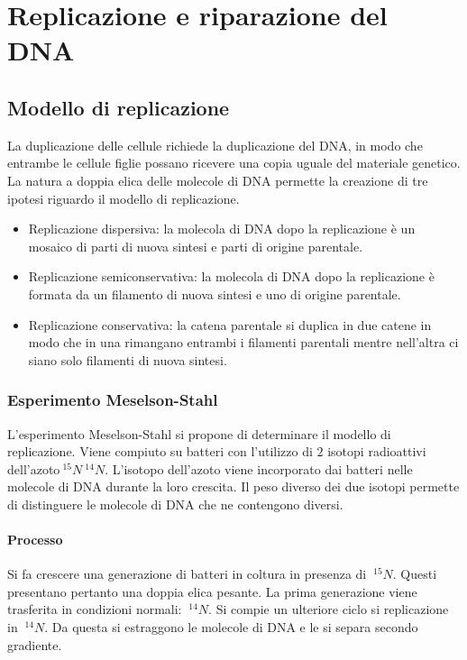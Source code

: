 \chapter{Replicazione e riparazione del DNA}

\section{Modello di replicazione}
La duplicazione delle cellule richiede la duplicazione del DNA, in modo che entrambe le cellule figlie possano ricevere una copia uguale del materiale genetico.
La natura a doppia elica delle molecole di DNA permette la creazione di tre ipotesi riguardo il modello di replicazione.
\begin{multicols}{2}
	\begin{itemize}
		\item Replicazione dispersiva: la molecola di DNA dopo la replicazione \`e un mosaico di parti di nuova sintesi e parti di origine parentale.
		\item Replicazione semiconservativa: la molecola di DNA dopo la replicazione \`e formata da un filamento di nuova sintesi e uno di origine parentale.
		\item Replicazione conservativa: la catena parentale si duplica in due catene in modo che in una rimangano entrambi i filamenti parentali mentre nell'altra ci siano solo filamenti di nuova sintesi.
	\end{itemize}
\end{multicols}

	\subsection{Esperimento Meselson-Stahl}
	L'esperimento Meselson-Stahl si propone di determinare il modello di replicazione.
	Viene compiuto su batteri con l'utilizzo di $2$ isotopi radioattivi dell'azoto\emph{$\ ^{15}N\ ^{14}N$}.
	L'isotopo dell'azoto viene incorporato dai batteri nelle molecole di DNA durante la loro crescita.
	Il peso diverso dei due isotopi permette di distinguere le molecole di DNA che ne contengono diversi.

		\subsubsection{Processo}
		Si fa crescere una generazione di batteri in coltura in presenza di \emph{$\ ^{15}N$}.
		Questi presentano pertanto una doppia elica pesante.
		La prima generazione viene trasferita in condizioni normali: \emph{$\ ^{14}N$}.
		Si compie un ulteriore ciclo si replicazione in \emph{$\ ^{14}N$}.
		Da questa si estraggono le molecole di DNA e le si separa secondo gradiente.
		
